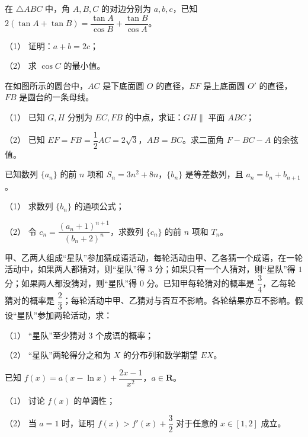 \begin{question}
在 \(\triangle ABC\) 中，角 \(A,B,C\) 的对边分别为 \(a,b,c\)，已知 \(2(\tan A+\tan B)=\dfrac{\tan A}{\cos B}+\dfrac{\tan B}{\cos A}\)。

（1） 证明：\(a+b=2c\)；

（2） 求 \(\cos C\) 的最小值。

\Needspace{0.4\textheight}
\end{question}
\begin{question}
在如图所示的圆台中，\(AC\) 是下底面圆 \(O\) 的直径，\(EF\) 是上底面圆 \(O'\) 的直径，\(FB\) 是圆台的一条母线。

（1） 已知 \(G,H\) 分别为 \(EC,FB\) 的中点，求证：\(GH\parallel\) 平面 \(ABC\)；

（2） 已知 \(EF=FB=\dfrac{1}{2}AC=2\sqrt{3}\)，\(AB=BC\)。求二面角 \(F-BC-A\) 的余弦值。
\nopagebreak[4]
\begin{center}\end{center}
\nopagebreak[4]
\end{question}
\begin{question}
已知数列 \(\{a_{n}\}\) 的前 \(n\) 项和 \(S_{n}=3n^{2}+8n\)，\(\{b_{n}\}\) 是等差数列，且 \(a_{n}=b_{n}+b_{n+1}\)。

（1） 求数列 \(\{b_{n}\}\) 的通项公式；

（2） 令 \(c_{n}=\dfrac{(a_{n}+1)^{n+1}}{(b_{n}+2)^{n}}\)，求数列 \(\{c_{n}\}\) 的前 \(n\) 项和 \(T_{n}\)。

\end{question}
\begin{question}
甲、乙两人组成“星队”参加猜成语活动，每轮活动由甲、乙各猜一个成语，在一轮活动中，如果两人都猜对，则“星队”得 \(3\) 分；如果只有一个人猜对，则“星队”得 \(1\) 分；如果两人都没猜对，则“星队”得 \(0\) 分。已知甲每轮猜对的概率是 \(\dfrac{3}{4}\)，乙每轮猜对的概率是 \(\dfrac{2}{3}\)；每轮活动中甲、乙猜对与否互不影响。各轮结果亦互不影响。假设“星队”参加两轮活动，求：

（1） “星队”至少猜对 \(3\) 个成语的概率；

（2） “星队”两轮得分之和为 \(X\) 的分布列和数学期望 \(EX\)。

\end{question}
\begin{question}
已知 \(f(x)=a(x-\ln x)+\dfrac{2x-1}{x^{2}}\)，\(a\in\mathbf{R}\)。

（1） 讨论 \(f(x)\) 的单调性；

（2） 当 \(a=1\) 时，证明 \(f(x)>f'(x)+\dfrac{3}{2}\) 对于任意的 \(x\in[1,2]\) 成立。

\Needspace{0.4\textheight}
\end{question}
